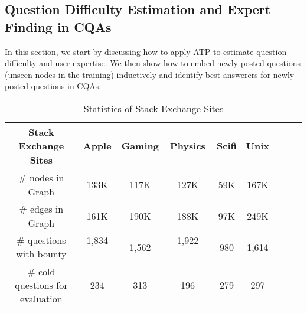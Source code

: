 \documentclass[letterpaper]{article} \usepackage{aaai19}  \usepackage{times}  \usepackage{helvet}  \usepackage{courier}  \usepackage{url}  \usepackage{graphicx}  \usepackage{booktabs} \usepackage{xcolor}
\begin{document}
\begin{comment}
    \item Leveraging higher order graph reachability to build $\boldsymbol{M}$ can be beneficial for preserving the asymmetric transitivity in comparison with using first order neighbors ({\em Adj}) (without accounting for reachability), since we can observe that ATP $\succ$ H-log-Adj, SA-linear $\succ$ SA-linear-Adj, and SA-log $\succ$ SA-log-Adj. For example, SA-linear improves over SA-linear-Adj by $3.1\%$ on Cit-HepPh.

    \item $log$ transformation is a better choice for leveraging graph hierarchy and reachability than linear transformation, since SA-log $\succ$ SA-linear, and SA-log-Adj $\succ$ SA-linear-Adj. For example, SA-log-Adj improves over SA-linear-Adj by $4.31\%$ on GNU. This observation is consistent with the results as shown in Table~\ref{tab:hge_hope_comparison}.

    \item We can observe that ATP $\succ$ SA-log, which shows the effectiveness of using our proposed method in Section~\ref{sec:inferring_graph_hierarchy} to infer graph hierarchy. It is worth mentioning that all the $6$ graph hierarchy based methods perform better than HOPE, indicating that nodes' hierarchy is better proximity for asymmetric transitivity preservation than high order measures proposed by HOPE.
\end{itemize}
\end{comment}





\subsection{Question Difficulty Estimation and Expert Finding in CQAs}
\label{sec:question_routing_cqas}

In this section, we start by discussing how to apply ATP to estimate question difficulty and user expertise. We then show how to embed newly posted questions (unseen nodes in the training) inductively and identify best answerers for newly posted questions in CQAs.

\begin{table}[t!]
\small
\centering
\caption{Statistics of Stack Exchange Sites} 
\setlength\tabcolsep{1pt} \begin{tabular}{c|cccccccc}
Stack Exchange Sites 　　　&  Apple  & Gaming & Physics & Scifi  & Unix\\ \hline
\# nodes in Graph   　　　& 133K  & 117K & 127K & 59K &   167K\\
\# edges in Graph  　　　 & 161K   & 190K & 188K & 97K &   249K\\
\# questions with bounty  & 1,834  　 & 1,562 & 1,922 　　　& 980 &   1,614 \\
\# cold questions  for evaluation  & 234 & 313 & 196 & 279        & 297 \\ 
\bottomrule
\end{tabular}
\label{tab:statistics_stack_exchange}
\end{table}
\end{document}
